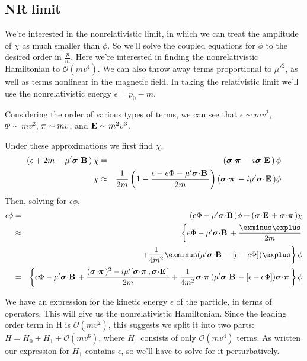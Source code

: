 \subsection{NR limit}
We're interested in the nonrelativistic limit, in which we can treat the amplitude of $\chi$ as much smaller than $\phi$.  So we'll solve the coupled equations for $\phi$ to the desired order in $\frac{p}{m}$.  Here we're interested in finding the nonrelativistic Hamiltonian to $\mathcal{O}(mv^4)$.  We can also throw away terms proportional to $\mu'^2$, as well as terms nonlinear in the magnetic field.  In taking the relativistic limit we'll use the nonrelativistic energy $\epsilon = p_0 - m$.



Considering the order of various types of terms, we can see that $\epsilon \sim mv^2$, $\Phi\sim mv^2$, $\mathbf{\pi} \sim mv$, and $\mathbf{E} \sim m^2v^3$.

Under these approximations we first find $\chi$.
\begin{eqnarray*}
	\left( \epsilon + 2m - \mu' \sigdot{B} \right ) \chi &=& \left( \sigdotg{\pi} - i\sigdot{E} \right) \phi	\\
	\chi &\approx&	\frac{1}{2m} \left ( 1- \frac{\epsilon - e\Phi - \mu' \sigdot{B}}{2m} \right ) (\sigdotg{\pi} - i\mu' \sigdot{E} )\phi
\end{eqnarray*}
Then, solving for $\epsilon\phi$,
\begin{eqnarray*}
	\epsilon \phi 	&=& (e\Phi - \mu' \sigdot{B} )\phi + (\sigdot{E} + \sigdotg{\pi}) \chi	\\
					&\approx& \left \{
		e\Phi - \mu' \sigdot{B} + \frac{ \exminus \explus}{2m}	\right. \\
		&& \left. +\frac{1}{4m^2} \exminus (\mu' \sigdot{B} - [\epsilon - e\Phi]) \explus 	
	\right \} \phi		\\
		&=& \left \{
				e\Phi - \mu' \sigdot{B} + \frac{(\sigdotg{\pi})^2 - i\mu' [\sigdotg{\pi}, \sigdot{E}]}{2m}
				+\frac{1}{4m^2} \sigdotg{\pi} (\mu' \sigdot{B} - [\epsilon - e\Phi]) \sigdotg{\pi} 
			\right \} \phi
\end{eqnarray*}

We have an expression for the kinetic energy $\epsilon$ of the particle, in terms of operators.  This will give us the nonrelativistic Hamiltonian. Since the leading order term in H is $\mathcal{O}(mv^2)$, this suggests we split it into two parts: $H = H_0 + H_1 +\mathcal{O}(mv^6)$, where $H_1$ consists of only $\mathcal{O}(mv^4)$ terms.  
As written our expression for $H_1$ contains $\epsilon$, so we'll have to solve for it perturbatively.

